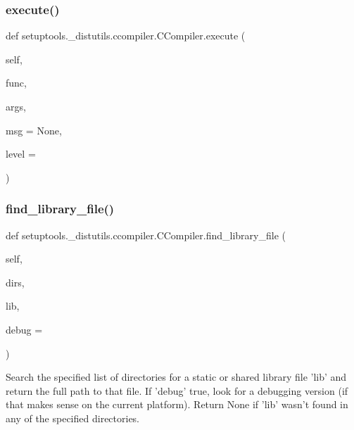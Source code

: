 \subsubsection{\texorpdfstring{execute()}{execute()}}
{\footnotesize\ttfamily def setuptools.\+\_\+distutils.\+ccompiler.\+C\+Compiler.\+execute (\begin{DoxyParamCaption}\item[{}]{self,  }\item[{}]{func,  }\item[{}]{args,  }\item[{}]{msg = {\ttfamily None},  }\item[{}]{level = {} }\end{DoxyParamCaption})}

\mbox{\label{classsetuptools_1_1__distutils_1_1ccompiler_1_1CCompiler_ac6847d5d245ef5e07d47686adbe80448}} 
\subsubsection{\texorpdfstring{find\+\_\+library\+\_\+file()}{find\_library\_file()}}
{\footnotesize\ttfamily def setuptools.\+\_\+distutils.\+ccompiler.\+C\+Compiler.\+find\+\_\+library\+\_\+file (\begin{DoxyParamCaption}\item[{}]{self,  }\item[{}]{dirs,  }\item[{}]{lib,  }\item[{}]{debug = {} }\end{DoxyParamCaption})}

\begin{DoxyVerb}Search the specified list of directories for a static or shared
library file 'lib' and return the full path to that file.  If
'debug' true, look for a debugging version (if that makes sense on
the current platform).  Return None if 'lib' wasn't found in any of
the specified directories.
\end{DoxyVerb}
 \mbox{\label{classsetuptools_1_1__distutils_1_1ccompiler_1_1CCompiler_a94a854b26006d2d55d8ec11c6997a636}} 
